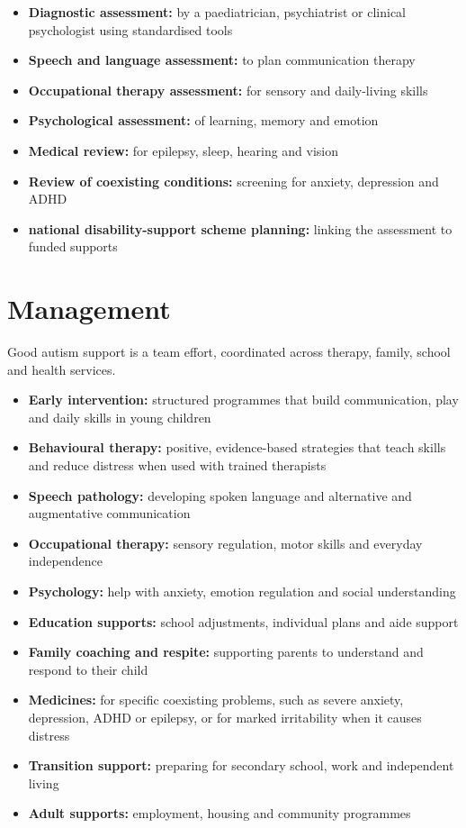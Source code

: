 \begin{itemize}
    \item \textbf{Diagnostic assessment:} by a paediatrician, psychiatrist or clinical psychologist using standardised tools
    \item \textbf{Speech and language assessment:} to plan communication therapy
    \item \textbf{Occupational therapy assessment:} for sensory and daily-living skills
    \item \textbf{Psychological assessment:} of learning, memory and emotion
    \item \textbf{Medical review:} for epilepsy, sleep, hearing and vision
    \item \textbf{Review of coexisting conditions:} screening for anxiety, depression and ADHD
    \item \textbf{national disability-support scheme planning:} linking the assessment to funded supports
\end{itemize}

\section*{Management}
Good autism support is a team effort, coordinated across therapy, family, school and health services.

\begin{itemize}
    \item \textbf{Early intervention:} structured programmes that build communication, play and daily skills in young children
    \item \textbf{Behavioural therapy:} positive, evidence-based strategies that teach skills and reduce distress when used with trained therapists
    \item \textbf{Speech pathology:} developing spoken language and alternative and augmentative communication
    \item \textbf{Occupational therapy:} sensory regulation, motor skills and everyday independence
    \item \textbf{Psychology:} help with anxiety, emotion regulation and social understanding
    \item \textbf{Education supports:} school adjustments, individual plans and aide support
    \item \textbf{Family coaching and respite:} supporting parents to understand and respond to their child
    \item \textbf{Medicines:} for specific coexisting problems, such as severe anxiety, depression, ADHD or epilepsy, or for marked irritability when it causes distress
    \item \textbf{Transition support:} preparing for secondary school, work and independent living
    \item \textbf{Adult supports:} employment, housing and community programmes
\end{itemize}

